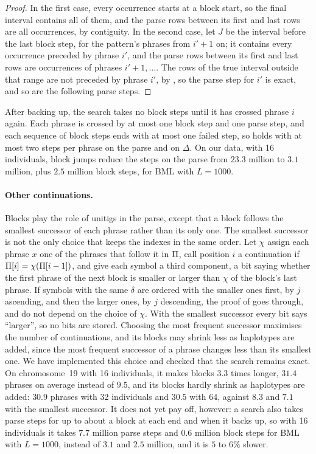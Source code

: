 \begin{proof}
In the first case, every occurrence starts at a block start, so the
final interval contains all of them, and the parse rows between its
first and last rows are all occurrences, by contiguity. In the second
case, let $J$ be the interval before the last block step, for the
pattern's phrases from $i' + 1$ on; it contains every occurrence
preceded by phrase $i'$, and the parse rows between its first and last
rows are occurrences of phrases $i' + 1, \ldots$. The rows of the true
interval outside that range are not preceded by phrase $i'$, by
, so the parse step for $i'$ is exact, and so are
the following parse steps.
\end{proof}

After backing up, the search takes no block steps until it has crossed
phrase $i$ again. Each phrase is crossed by at most one block step and
one parse step, and each sequence of block steps ends with at most one
failed step, so  holds with at most two steps per
phrase on the parse and on $\Delta$. On our data, with 16 individuals, block jumps reduce the steps on
the parse from $23.3$ million to $3.1$ million, plus $2.5$ million block
steps, for BML with $L = 1000$.

\paragraph*{Other continuations.}
Blocks play the role of unitigs in the parse, except that a block
follows the smallest successor of each phrase rather than its only one.
The smallest successor is not the only choice that keeps the indexes in
the same order. Let $\chi$ assign each phrase $x$ one of the phrases that
follow it in $\Pi$, call position $i$ a continuation if $\Pi[i] =
\chi(\Pi[i-1])$, and give each symbol a third component, a bit saying
whether the first phrase of the next block is smaller or larger than $\chi$
of the block's last phrase. If symbols with the same $\delta$ are ordered
with the smaller ones first, by $j$ ascending, and then the larger
ones, by $j$ descending, the proof of  goes
through, and  do not depend on the
choice of $\chi$. With the smallest successor every bit says ``larger'', so
no bits are stored. Choosing the most frequent successor maximises the
number of continuations, and its blocks may shrink less as haplotypes
are added, since the most frequent successor of a phrase changes less
than its smallest one. We have implemented this choice and checked that
the search remains exact. On chromosome~19 with 16 individuals, it makes
blocks $3.3$ times longer, $31.4$ phrases on average instead of $9.5$,
and its blocks hardly shrink as haplotypes are added: $30.9$ phrases
with 32 individuals and $30.5$ with 64, against $8.3$ and $7.1$ with
the smallest successor. It does not yet pay off, however: a search also
takes parse steps for up to about a block at each end and when it backs
up, so with 16 individuals it takes $7.7$ million parse steps and $0.6$
million block steps for BML with $L = 1000$, instead of $3.1$ and $2.5$
million, and it is $5$ to $6\%$ slower.

